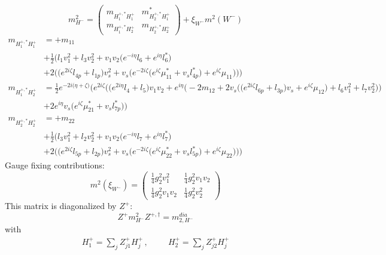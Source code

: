 \begin{itemize}
\begin{equation} 
m^2_{H^-} = \left( 
\begin{array}{cc}
m_{H_1^{+,*}H_1^+} &m^*_{H_2^{+,*}H_1^+}\\ 
m_{H_1^{+,*}H_2^+} &m_{H_2^{+,*}H_2^+}\end{array} 
\right) +  \xi_{W^-}m^2(W^-) 
 \end{equation} 
\begin{align} 
m_{H_1^{+,*}H_1^+} &= +m_{11}\nonumber \\ 
 &+\frac{1}{2} \Big(l_1 v_{1}^{2} +l_3 v_{2}^{2} +v_1 v_2 \Big(e^{-i \eta } l_6  + e^{i \eta } l_6^* \Big)\nonumber \\ 
 &+2 \Big(\Big(e^{2 i \zeta } l_{4p}  + l_{1p}\Big)v_{s}^{2}  + v_s \Big(e^{-2 i \zeta } \Big(e^{i \zeta } \mu_{11}^*  + v_s l_{4p}^* \Big) + e^{i \zeta } \mu_{11} \Big)\Big)\Big)\\ 
m_{H_1^{+,*}H_2^+} &= \frac{1}{2} e^{-2 i \Big(\eta +\zeta \Big)} \Big(e^{2 i \zeta } \Big(\Big(e^{2 i \eta } l_4  + l_5\Big)v_1 v_2  + e^{i \eta } \Big(-2 m_{12}  + 2 v_s \Big(\Big(e^{2 i \zeta } l_{6p}  + l_{3p}\Big)v_s  + e^{i \zeta } \mu_{12} \Big) + l_6 v_{1}^{2}  + l_7 v_{2}^{2} \Big)\Big)\nonumber \\ 
 &+2 e^{i \eta } v_s \Big(e^{i \zeta } \mu_{21}^*  + v_s l_{7p}^* \Big)\Big)\\ 
m_{H_2^{+,*}H_2^+} &= +m_{22}\nonumber \\ 
 &+\frac{1}{2} \Big(l_3 v_{1}^{2} +l_2 v_{2}^{2} +v_1 v_2 \Big(e^{-i \eta } l_7  + e^{i \eta } l_7^* \Big)\nonumber \\ 
 &+2 \Big(\Big(e^{2 i \zeta } l_{5p}  + l_{2p}\Big)v_{s}^{2}  + v_s \Big(e^{-2 i \zeta } \Big(e^{i \zeta } \mu_{22}^*  + v_s l_{5p}^* \Big) + e^{i \zeta } \mu_{22} \Big)\Big)\Big)
\end{align} 
Gauge fixing contributions: 
\begin{equation} 
m^2 (\xi_{W^-}) = \left( 
\begin{array}{cc}
\frac{1}{4} g_{2}^{2} v_{1}^{2}  &\frac{1}{4} g_{2}^{2} v_1 v_2 \\ 
\frac{1}{4} g_{2}^{2} v_1 v_2  &\frac{1}{4} g_{2}^{2} v_{2}^{2} \end{array} 
\right) 
 \end{equation} 
This matrix is diagonalized by \(Z^+\): 
\begin{equation} 
Z^+ m^2_{H^-} Z^{+,\dagger} = m^{dia}_{2,H^-} 
\end{equation} 
with 
\begin{align} 
H_1^+ = \sum_{j}Z_{{j 1}}^{+}H^+_{{j}}\,, \hspace{1cm} 
H_2^+ = \sum_{j}Z_{{j 2}}^{+}H^+_{{j}}
\end{align} 
\end{itemize} 
